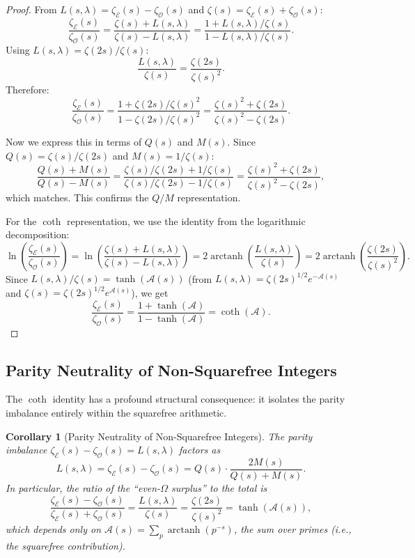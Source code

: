 \documentclass[11pt,a4paper]{article}
\theoremstyle{plain}
\newtheorem{corollary}[theorem]{Corollary}
\theoremstyle{definition}
\newcommand{\EE}{\mathcal{E}}
\newcommand{\OO}{\mathcal{O}}
\newcommand{\cA}{\mathcal{A}}
\begin{document}
\begin{proof}
From $L(s,\lambda) = \zeta_{\EE}(s) - \zeta_{\OO}(s)$ and $\zeta(s) = \zeta_{\EE}(s) + \zeta_{\OO}(s)$:
\[
\frac{\zeta_{\EE}(s)}{\zeta_{\OO}(s)} = \frac{\zeta(s) + L(s,\lambda)}{\zeta(s) - L(s,\lambda)} = \frac{1 + L(s,\lambda)/\zeta(s)}{1 - L(s,\lambda)/\zeta(s)}.
\]
Using $L(s,\lambda) = \zeta(2s)/\zeta(s)$:
\[
\frac{L(s,\lambda)}{\zeta(s)} = \frac{\zeta(2s)}{\zeta(s)^2}.
\]
Therefore:
\[
\frac{\zeta_{\EE}(s)}{\zeta_{\OO}(s)} = \frac{1 + \zeta(2s)/\zeta(s)^2}{1 - \zeta(2s)/\zeta(s)^2} = \frac{\zeta(s)^2 + \zeta(2s)}{\zeta(s)^2 - \zeta(2s)}.
\]

Now we express this in terms of $Q(s)$ and $M(s)$. Since $Q(s) = \zeta(s)/\zeta(2s)$ and $M(s) = 1/\zeta(s)$:
\[
\frac{Q(s) + M(s)}{Q(s) - M(s)} = \frac{\zeta(s)/\zeta(2s) + 1/\zeta(s)}{\zeta(s)/\zeta(2s) - 1/\zeta(s)} = \frac{\zeta(s)^2 + \zeta(2s)}{\zeta(s)^2 - \zeta(2s)},
\]
which matches. This confirms the $Q/M$ representation.

For the $\coth$ representation, we use the identity from the logarithmic decomposition:
\[
\ln\!\left(\frac{\zeta_{\EE}(s)}{\zeta_{\OO}(s)}\right) = \ln\!\left(\frac{\zeta(s) + L(s,\lambda)}{\zeta(s) - L(s,\lambda)}\right) = 2\operatorname{arctanh}\!\left(\frac{L(s,\lambda)}{\zeta(s)}\right) = 2\operatorname{arctanh}\!\left(\frac{\zeta(2s)}{\zeta(s)^2}\right).
\]
Since $L(s,\lambda)/\zeta(s) = \tanh(\cA(s))$ (from $L(s,\lambda) = \zeta(2s)^{1/2} e^{-\cA(s)}$ and $\zeta(s) = \zeta(2s)^{1/2} e^{\cA(s)}$), we get
\[
\frac{\zeta_{\EE}(s)}{\zeta_{\OO}(s)} = \frac{1 + \tanh(\cA)}{1 - \tanh(\cA)} = \coth(\cA).
\]
\end{proof}

\subsection{Parity Neutrality of Non-Squarefree Integers}

The $\coth$ identity has a profound structural consequence: it isolates the parity imbalance entirely within the squarefree arithmetic.

\begin{corollary}[Parity Neutrality of Non-Squarefree Integers]\label{cor:parity-neutral}
The parity imbalance $\zeta_{\EE}(s) - \zeta_{\OO}(s) = L(s,\lambda)$ factors as
\begin{equation}\label{eq:factor-parity}
L(s,\lambda) = \zeta_{\EE}(s) - \zeta_{\OO}(s) = Q(s) \cdot \frac{2M(s)}{Q(s) + M(s)}.
\end{equation}
In particular, the ratio of the ``even-$\Omega$ surplus'' to the total is
\begin{equation}\label{eq:imbalance}
\frac{\zeta_{\EE}(s) - \zeta_{\OO}(s)}{\zeta_{\EE}(s) + \zeta_{\OO}(s)} = \frac{L(s,\lambda)}{\zeta(s)} = \frac{\zeta(2s)}{\zeta(s)^2} = \tanh(\cA(s)),
\end{equation}
which depends only on $\cA(s) = \sum_p \operatorname{arctanh}(p^{-s})$, the sum over primes (i.e., the squarefree contribution).
\end{corollary}
\end{document}
